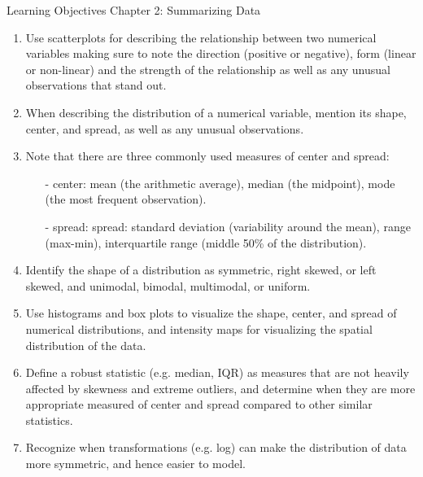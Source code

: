 \documentclass[11pt]{article}
\begin{document}
{\LARGE \textcolor{oiB}{Learning Objectives \hfill Chapter 2: Summarizing Data}} \\

\begin{enumerate}
\renewcommand\labelenumi{\textcolor{light}{\textbf{LO \theenumi.}}}
\item Use scatterplots for describing the relationship between two numerical variables making sure to note the direction (positive or negative), form (linear or non-linear) and the strength of the relationship as well as any unusual observations that stand out.
\item When describing the distribution of a numerical variable, mention its shape, center, and spread, as well as any unusual observations.
\item Note that there are three commonly used measures of center and spread: 
\begin{itemize}
\item[-] center: mean (the arithmetic average), median (the midpoint), mode (the most frequent observation).
\item[-] spread: spread: standard deviation (variability around the mean), range (max-min), interquartile range (middle 50\% of the distribution).
\end{itemize}
\item Identify the shape of a distribution as symmetric, right skewed, or left skewed, and unimodal, bimodal, multimodal, or uniform.
\item Use histograms and box plots to visualize the shape, center, and spread of numerical distributions, and intensity maps for visualizing the spatial distribution of the data.
\item Define a robust statistic (e.g. median, IQR) as measures that are not heavily affected by skewness and extreme outliers, and determine when they are more appropriate measured of center and spread compared to other similar statistics.
\item Recognize when transformations (e.g. log) can make the distribution of data more symmetric, and hence easier to model.
\end{enumerate}
\end{document}
